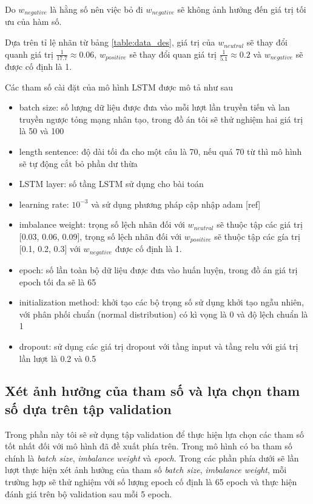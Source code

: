 \documentclass[fontsize=12pt]{scrartcl}
\begin{document}
Do $w_{negative}$ là hằng số nên việc bỏ đi $w_{negative}$ sẽ không ảnh hưởng đến giá trị tối ưu của hàm số.
\par
Dựa trên tỉ lệ nhãn từ bảng \ref{table:data_des}, giá trị của $w_{neutral}$ sẽ thay đổi quanh giá trị $\frac{1}{17.7} \approx 0.06  $, $w_{positive}$ sẽ thay đổi quan giá trị $\frac{1}{5.1} \approx 0.2$ và $w_{negative}$ sẽ được cố định là 1.
\par
Các tham số cài đặt của mô hình LSTM được mô tả như sau
\begin{itemize}
\item batch size: số lượng dữ liệu được đưa vào mỗi lượt lần truyền tiến và lan truyền ngược tỏng mạng nhân tạo, trong đồ án tôi sẽ thử nghiệm hai giá trị là 50 và 100
\item length sentence: độ dài tối đa cho một câu là 70, nếu quá 70 từ thì mô hình sẽ tự động cắt bỏ phần dư thừa
\item LSTM layer: số tầng LSTM sử dụng cho bài toán
\item learning rate: $10^{-3}$ và sử dụng phương pháp cập nhập adam [ref]
\item imbalance weight: trọng số lệch nhãn đối với $w_{neutral}$ sẽ thuộc tập các giá trị [0.03, 0.06, 0.09], trọng số lệch nhãn đối với $w_{positive}$ sẽ thuộc tập các gía trị [0.1, 0.2, 0.3] với $w_{negative}$ được cố định là 1.
\item epoch: số lần toàn bộ dữ liệu được đưa vào huấn luyện, trong đồ án giá trị epoch tối đa sẽ là 65
\item initialization method: khởi tạo các bộ trọng số sử dụng khởi tạo ngẫu nhiên, với phân phối chuẩn (normal distribution) có kì vọng là 0 và độ lệch chuẩn là 1
\item dropout: sử dụng các giá trị dropout với tầng input và tầng relu với giá trị lần lượt là 0.2 và 0.5
\end{itemize}
\subsection{Xét ảnh hưởng của tham số và lựa chọn tham số dựa trên tập validation}
Trong phần này tôi sẽ sử dụng tập validation để thực hiện lựa chọn các tham số tốt nhất đối với mô hình đã đề xuất phía trên. Trong mô hình có ba tham số chính là \textit{batch size}, \textit{imbalance weight} và \textit{epoch}. Trong các phần phía dưới sẽ lần lượt thực hiện xét ảnh hưởng của tham số \textit{batch size}, \textit{imbalance weight}, mỗi trường hợp sẽ thử nghiệm với số lượng epoch cố định là 65 epoch và thực hiện đánh giá trên bộ validation sau mỗi 5 epoch.
\end{document}
